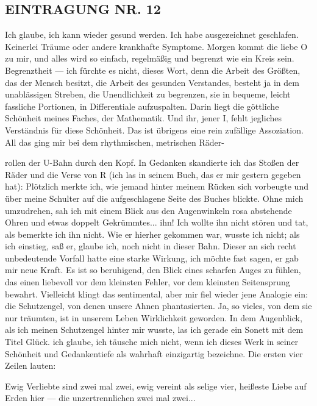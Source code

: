 \subsection{EINTRAGUNG NR. 12}

Ich glaube, ich kann wieder gesund werden. Ich habe ausgezeichnet
geschlafen. Keinerlei Träume oder andere krankhafte Symptome.
Morgen kommt die liebe O zu mir, und alles wird so einfach,
regelmäßig und begrenzt wie ein Kreis sein. Begrenztheit — ich
fürchte es nicht, dieses Wort, denn die Arbeit des Größten, das der
Mensch besitzt, die Arbeit des gesunden Verstandes, besteht ja in
dem unablässigen Streben, die Unendlichkeit zu begrenzen, sie in
bequeme, leicht fassliche Portionen, in Differentiale aufzuspalten.
Darin liegt die göttliche Schönheit meines Faches, der Mathematik.
Und ihr, jener I, fehlt jegliches Verständnis für diese Schönheit.
Das ist übrigens eine rein zufällige Assoziation. All das ging mir
bei dem rhythmischen, metrischen Räder-

rollen der U-Bahn durch den Kopf. In Gedanken skandierte ich das
Stoßen der Räder und die Verse von R (ich las in seinem Buch, das
er mir gestern gegeben hat): Plötzlich merkte ich, wie jemand
hinter meinem Rücken sich vorbeugte und über meine Schulter auf die
aufgeschlagene Seite des Buches blickte. Ohne mich umzudrehen, sah
ich mit einem Blick aus den Augenwinkeln rosa abstehende Ohren und
etwas doppelt Gekrümmtes... ihn! Ich wollte ihn nicht stören und
tat, als bemerkte ich ihn nicht. Wie er hierher gekommen war,
wusste ich nicht; als ich einstieg, saß er, glaube ich, noch nicht
in dieser Bahn. Dieser an sich recht unbedeutende Vorfall hatte
eine starke Wirkung, ich möchte fast sagen, er gab mir neue Kraft.
Es ist so beruhigend, den Blick eines scharfen Auges zu fühlen, das
einen liebevoll vor dem kleinsten Fehler, vor dem kleinsten
Seitensprung bewahrt. Vielleicht klingt das sentimental, aber mir
fiel wieder jene Analogie ein: die Schutzengel, von denen unsere
Ahnen phantasierten. Ja, so vieles, von dem sie nur träumten, ist
in unserem Leben Wirklichkeit geworden. In dem Augenblick, als ich
meinen Schutzengel hinter mir wusste, las ich gerade ein Sonett mit
dem Titel Glück. ich glaube, ich täusche mich nicht, wenn ich
dieses Werk in seiner Schönheit und Gedankentiefe als wahrhaft
einzigartig bezeichne. Die ersten vier Zeilen lauten:

Ewig Verliebte sind zwei mal zwei, ewig vereint als selige vier,
heißeste Liebe auf Erden hier — die unzertrennlichen zwei mal
zwei...

